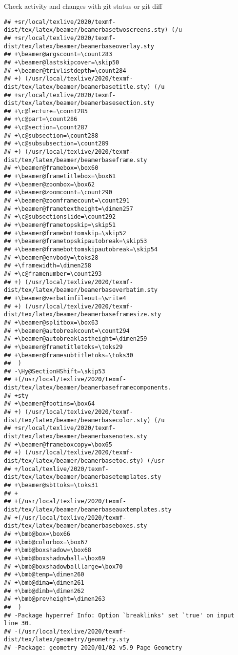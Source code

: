 \documentclass[ignorenonframetext,]{beamer}
\begin{document}
\begin{frame}[fragile]{Check activity and changes with git status or git
diff}
\begin{verbatim}
## +sr/local/texlive/2020/texmf-dist/tex/latex/beamer/beamerbasetwoscreens.sty) (/u
## +sr/local/texlive/2020/texmf-dist/tex/latex/beamer/beamerbaseoverlay.sty
## +\beamer@argscount=\count283
## +\beamer@lastskipcover=\skip50
## +\beamer@trivlistdepth=\count284
## +) (/usr/local/texlive/2020/texmf-dist/tex/latex/beamer/beamerbasetitle.sty) (/u
## +sr/local/texlive/2020/texmf-dist/tex/latex/beamer/beamerbasesection.sty
## +\c@lecture=\count285
## +\c@part=\count286
## +\c@section=\count287
## +\c@subsection=\count288
## +\c@subsubsection=\count289
## +) (/usr/local/texlive/2020/texmf-dist/tex/latex/beamer/beamerbaseframe.sty
## +\beamer@framebox=\box60
## +\beamer@frametitlebox=\box61
## +\beamer@zoombox=\box62
## +\beamer@zoomcount=\count290
## +\beamer@zoomframecount=\count291
## +\beamer@frametextheight=\dimen257
## +\c@subsectionslide=\count292
## +\beamer@frametopskip=\skip51
## +\beamer@framebottomskip=\skip52
## +\beamer@frametopskipautobreak=\skip53
## +\beamer@framebottomskipautobreak=\skip54
## +\beamer@envbody=\toks28
## +\framewidth=\dimen258
## +\c@framenumber=\count293
## +) (/usr/local/texlive/2020/texmf-dist/tex/latex/beamer/beamerbaseverbatim.sty
## +\beamer@verbatimfileout=\write4
## +) (/usr/local/texlive/2020/texmf-dist/tex/latex/beamer/beamerbaseframesize.sty
## +\beamer@splitbox=\box63
## +\beamer@autobreakcount=\count294
## +\beamer@autobreaklastheight=\dimen259
## +\beamer@frametitletoks=\toks29
## +\beamer@framesubtitletoks=\toks30
##  )
## -\Hy@SectionHShift=\skip53
## +(/usr/local/texlive/2020/texmf-dist/tex/latex/beamer/beamerbaseframecomponents.
## +sty
## +\beamer@footins=\box64
## +) (/usr/local/texlive/2020/texmf-dist/tex/latex/beamer/beamerbasecolor.sty) (/u
## +sr/local/texlive/2020/texmf-dist/tex/latex/beamer/beamerbasenotes.sty
## +\beamer@frameboxcopy=\box65
## +) (/usr/local/texlive/2020/texmf-dist/tex/latex/beamer/beamerbasetoc.sty) (/usr
## +/local/texlive/2020/texmf-dist/tex/latex/beamer/beamerbasetemplates.sty
## +\beamer@sbttoks=\toks31
## +
## +(/usr/local/texlive/2020/texmf-dist/tex/latex/beamer/beamerbaseauxtemplates.sty
## +(/usr/local/texlive/2020/texmf-dist/tex/latex/beamer/beamerbaseboxes.sty
## +\bmb@box=\box66
## +\bmb@colorbox=\box67
## +\bmb@boxshadow=\box68
## +\bmb@boxshadowball=\box69
## +\bmb@boxshadowballlarge=\box70
## +\bmb@temp=\dimen260
## +\bmb@dima=\dimen261
## +\bmb@dimb=\dimen262
## +\bmb@prevheight=\dimen263
##  )
## -Package hyperref Info: Option `breaklinks' set `true' on input line 30.
## -(/usr/local/texlive/2020/texmf-dist/tex/latex/geometry/geometry.sty
## -Package: geometry 2020/01/02 v5.9 Page Geometry

\end{verbatim}
\end{frame}
\end{document}
